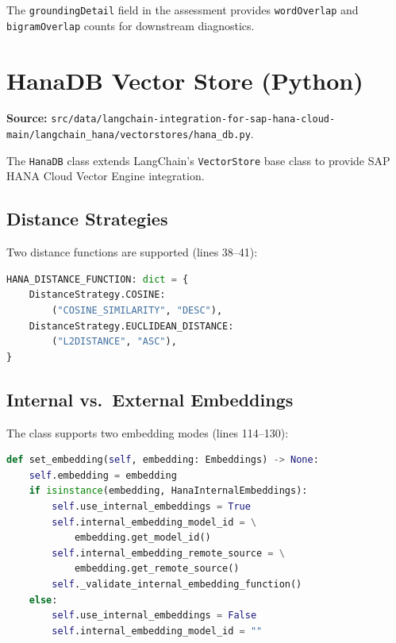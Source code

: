 \documentclass[11pt]{article}
\begin{document}
The \texttt{groundingDetail} field in the assessment provides
\texttt{wordOverlap} and \texttt{bigramOverlap} counts for downstream
diagnostics.

\section{HanaDB Vector Store (Python)}
\label{sec:hana-db-python}

\noindent\textbf{Source:}
\texttt{src/data/langchain-integration-for-sap-hana-cloud-main/langchain\_hana/vectorstores/hana\_db.py}.

The \texttt{HanaDB} class extends LangChain's \texttt{VectorStore} base class to
provide SAP HANA Cloud Vector Engine integration.

\subsection{Distance Strategies}

Two distance functions are supported (lines 38--41):

\begin{lstlisting}[language=Python,caption={Distance function mapping --- lines 38--41}]
HANA_DISTANCE_FUNCTION: dict = {
    DistanceStrategy.COSINE:
        ("COSINE_SIMILARITY", "DESC"),
    DistanceStrategy.EUCLIDEAN_DISTANCE:
        ("L2DISTANCE", "ASC"),
}
\end{lstlisting}

\subsection{Internal vs.\ External Embeddings}

The class supports two embedding modes (lines 114--130):

\begin{lstlisting}[language=Python,caption={Embedding mode selection --- lines 114--130}]
def set_embedding(self, embedding: Embeddings) -> None:
    self.embedding = embedding
    if isinstance(embedding, HanaInternalEmbeddings):
        self.use_internal_embeddings = True
        self.internal_embedding_model_id = \
            embedding.get_model_id()
        self.internal_embedding_remote_source = \
            embedding.get_remote_source()
        self._validate_internal_embedding_function()
    else:
        self.use_internal_embeddings = False
        self.internal_embedding_model_id = ""
\end{lstlisting}
\end{document}
